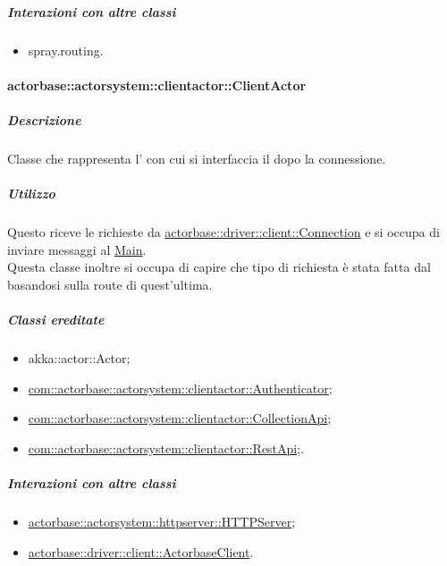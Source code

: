 \documentclass{scalatekids-article}
\begin{document}
\subparagraph{Interazioni con altre classi}

\begin{itemize}
\item spray.routing.
\end{itemize}

\paragraph{actorbase::actorsystem::clientactor::ClientActor} %
\label{sec:actorbase::actorsystem::clientactor::ClientActor}

\subparagraph{Descrizione}

Classe che rappresenta l' con cui si interfaccia il  dopo
la connessione.

\subparagraph{Utilizzo}

Questo  riceve le richieste da \hyperref[sec:actorbase::driver::client::Connection]{actorbase::driver::client::Connection}
e si occupa di inviare messaggi al \hyperref[sec:actorbase::actorsystem::main::Main]{Main}. \\
Questa classe inoltre si occupa di capire che tipo di richiesta è stata fatta dal  basandosi sulla route di quest'ultima.

\subparagraph{Classi ereditate}

\begin{itemize}

\item akka::actor::Actor;
\item \hyperref[com::actorbase::actorsystem::clientactor::Authenticator]{com::actorbase::actorsystem::clientactor::Authenticator};
\item \hyperref[com::actorbase::actorsystem::clientactor::CollectionApi]{com::actorbase::actorsystem::clientactor::CollectionApi};
\item \hyperref[com::actorbase::actorsystem::clientactor::RestApi]{com::actorbase::actorsystem::clientactor::RestApi};.

\end{itemize}

\subparagraph{Interazioni con altre classi}

\begin{itemize}
\item \hyperref[sec:actorbase::actorsystem::httpserver::HTTPServer]{actorbase::actorsystem::\allowbreak{}httpserver::\allowbreak{}HTTPServer};
\item \hyperref[sec:actorbase::driver::client::ActorbaseClient]{actorbase::driver::\allowbreak{}client::\allowbreak{}ActorbaseClient}.
\end{itemize}
\end{document}

